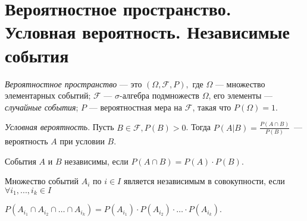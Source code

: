 \section{Вероятностное пространство. Условная вероятность. Независимые события}

\begin{definition} \textit{Вероятностное пространство} --- это $(\Omega, \mathcal{F}, P),$ где
    $\Omega$ --- множество элементарных событий;
    $\mathcal{F}$ ---  $\sigma$-алгебра подмножеств $\Omega$, его элементы --- \textit{случайные события};
    $P$ --- вероятностная мера на $\mathcal{F}$, такая что $P(\Omega) = 1$.
\end{definition}


\begin{definition} \textit{Условная вероятность}.
    Пусть $B \in \mathcal{F}, P(B) > 0$. Тогда
    $P(A|B) = \frac{P(A\cap B)}{P(B)}$~--- вероятность $A$ при условии $B$.

\end{definition}

\begin{definition}
    События $A$ и $B$ независимы, если 
    $P(A \cap B) = P(A) \cdot P(B)$.

\end{definition}

\begin{definition}
    Множество событий $A_i$ по $i \in I$ является независимым в совокупности, если
    $\forall i_1, ..., i_k \in I$

    $P(A_{i_1}\cap A_{i_2} \cap\ldots\cap A_{i_k}) = P(A_{i_1})\cdot P(A_{i_2})\cdot\ldots\cdot P(A_{i_k})$.

\end{definition}